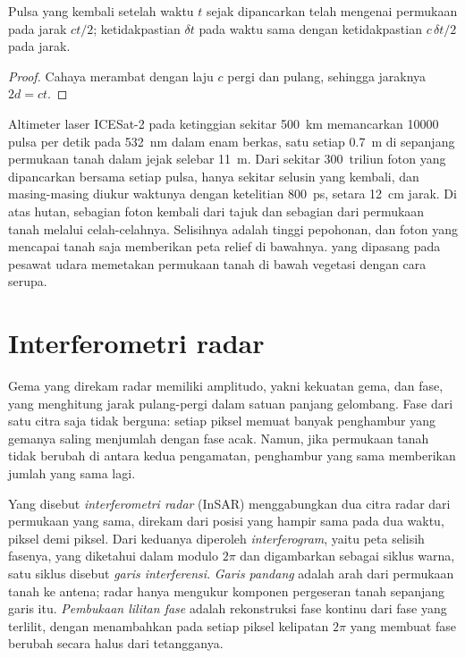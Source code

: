 \begin{proposition}\label{prop:b3:remote-sensing-gis:tof}
Pulsa yang kembali setelah waktu $t$ sejak dipancarkan telah mengenai permukaan pada
jarak $ct/2$; ketidakpastian $\delta t$ pada waktu sama dengan ketidakpastian
$c\,\delta t/2$ pada jarak.
\end{proposition}

\begin{proof}
Cahaya merambat dengan laju $c$ pergi dan pulang, sehingga jaraknya $2d = ct$.
\end{proof}

Altimeter laser ICESat-2 pada ketinggian sekitar \qty{500}{km} memancarkan
\num{10000} pulsa per detik pada \qty{532}{nm} dalam enam berkas, satu setiap
\qty{0.7}{m} di sepanjang permukaan tanah dalam jejak selebar \qty{11}{m}. Dari
sekitar 300~triliun foton yang dipancarkan bersama setiap pulsa, hanya sekitar selusin yang kembali, dan
masing-masing diukur waktunya dengan ketelitian \qty{800}{ps}, setara \qty{12}{cm} jarak. Di atas
hutan, sebagian foton kembali dari tajuk dan sebagian dari permukaan tanah
melalui celah-celahnya. Selisihnya adalah tinggi pepohonan, dan
foton yang mencapai tanah saja memberikan peta relief di bawahnya.  yang dipasang
pada pesawat udara memetakan permukaan tanah di bawah vegetasi dengan cara serupa.

\section{Interferometri radar}\label{sec:b3:remote-sensing-gis:insar}

Gema yang direkam radar memiliki amplitudo, yakni kekuatan gema,
dan fase, yang menghitung jarak pulang-pergi dalam satuan
panjang gelombang. Fase dari satu citra saja tidak berguna: setiap piksel memuat banyak
penghambur yang gemanya saling menjumlah dengan fase acak. Namun, jika permukaan tanah tidak
berubah di antara kedua pengamatan, penghambur yang sama memberikan jumlah yang sama lagi.

\begin{definition}\label{def:b3:remote-sensing-gis:insar}
Yang disebut \emph{interferometri radar} (InSAR) menggabungkan
dua citra radar dari permukaan yang sama, direkam dari posisi yang hampir sama
pada dua waktu, piksel demi piksel. Dari keduanya diperoleh \emph{interferogram},
yaitu peta selisih fasenya, yang diketahui dalam modulo $2\pi$ dan
digambarkan sebagai siklus warna, satu siklus disebut \emph{garis interferensi}. \emph{Garis
pandang} adalah arah dari permukaan tanah ke
antena; radar hanya mengukur komponen pergeseran tanah sepanjang
garis itu. \emph{Pembukaan lilitan fase} adalah rekonstruksi
fase kontinu dari fase yang terlilit, dengan menambahkan pada setiap piksel
kelipatan $2\pi$ yang membuat fase berubah secara halus dari tetangganya.
\end{definition}

